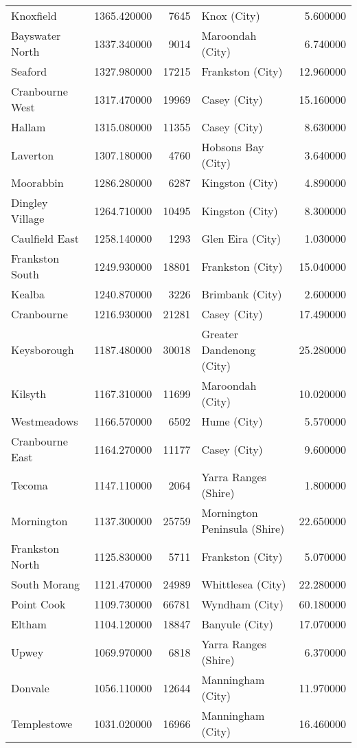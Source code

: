 \begin{longtable}{lrrlr}
Knoxfield & 1365.420000 & 7645 & Knox (City) & 5.600000 \\
Bayswater North & 1337.340000 & 9014 & Maroondah (City) & 6.740000 \\
Seaford & 1327.980000 & 17215 & Frankston (City) & 12.960000 \\
Cranbourne West & 1317.470000 & 19969 & Casey (City) & 15.160000 \\
Hallam & 1315.080000 & 11355 & Casey (City) & 8.630000 \\
Laverton & 1307.180000 & 4760 & Hobsons Bay (City) & 3.640000 \\
Moorabbin & 1286.280000 & 6287 & Kingston (City) & 4.890000 \\
Dingley Village & 1264.710000 & 10495 & Kingston (City) & 8.300000 \\
Caulfield East & 1258.140000 & 1293 & Glen Eira (City) & 1.030000 \\
Frankston South & 1249.930000 & 18801 & Frankston (City) & 15.040000 \\
Kealba & 1240.870000 & 3226 & Brimbank (City) & 2.600000 \\
Cranbourne & 1216.930000 & 21281 & Casey (City) & 17.490000 \\
Keysborough & 1187.480000 & 30018 & Greater Dandenong (City) & 25.280000 \\
Kilsyth & 1167.310000 & 11699 & Maroondah (City) & 10.020000 \\
Westmeadows & 1166.570000 & 6502 & Hume (City) & 5.570000 \\
Cranbourne East & 1164.270000 & 11177 & Casey (City) & 9.600000 \\
Tecoma & 1147.110000 & 2064 & Yarra Ranges (Shire) & 1.800000 \\
Mornington & 1137.300000 & 25759 & Mornington Peninsula (Shire) & 22.650000 \\
Frankston North & 1125.830000 & 5711 & Frankston (City) & 5.070000 \\
South Morang & 1121.470000 & 24989 & Whittlesea (City) & 22.280000 \\
Point Cook & 1109.730000 & 66781 & Wyndham (City) & 60.180000 \\
Eltham & 1104.120000 & 18847 & Banyule (City) & 17.070000 \\
Upwey & 1069.970000 & 6818 & Yarra Ranges (Shire) & 6.370000 \\
Donvale & 1056.110000 & 12644 & Manningham (City) & 11.970000 \\
Templestowe & 1031.020000 & 16966 & Manningham (City) & 16.460000 \\

\end{longtable}
